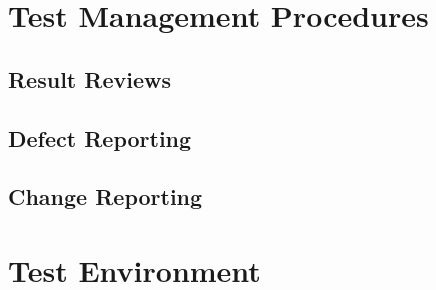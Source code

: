 \documentclass[english]{article}
\begin{document}
	\section{Test Management Procedures}
		\subsection{Result Reviews}
		\subsection{Defect Reporting}
		\subsection{Change Reporting}
		
	\section{Test Environment}
		
\end{document}

